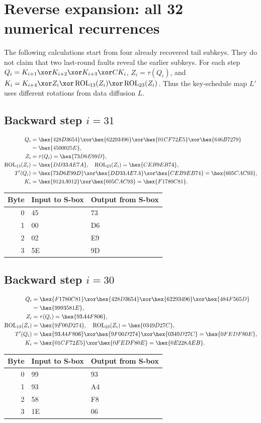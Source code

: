 \section{Reverse expansion: all 32 numerical recurrences}
The following calculations start from four already recovered tail subkeys. They do not claim that two last-round faults reveal the earlier subkeys. For each step $Q_i=K_{i+1}\xor K_{i+2}\xor K_{i+3}\xor CK_i$, $Z_i=\tau(Q_i)$, and $K_i=K_{i+4}\xor Z_i\xor\operatorname{ROL}_{13}(Z_i)\xor\operatorname{ROL}_{23}(Z_i)$. Thus the key-schedule map $L'$ uses different rotations from data diffusion $L$.
\subsection*{Backward step $i=31$}
\begin{align*}
Q_i&=\hex{428D3654}\xor\hex{62293496}\xor\hex{01CF72E5}\xor\hex{646B7279}\\&=\hex{4500025E},\\
Z_i&=\tau(Q_i)=\hex{73D6E99D},\\
\operatorname{ROL}_{13}(Z_i)&=\hex{DD33AE7A},\quad\operatorname{ROL}_{23}(Z_i)=\hex{CEB9EB74},\\
T'(Q_i)&=\hex{73D6E99D}\xor\hex{DD33AE7A}\xor\hex{CEB9EB74}=\hex{605CAC93},\\
K_i&=\hex{9124A012}\xor\hex{605CAC93}=\hex{F1780C81}.\end{align*}
\begingroup\small
\begin{longtable}{rll}
\toprule
Byte & Input to S-box & Output from S-box\\\midrule
\endhead
0 & 45 & 73\\
1 & 00 & D6\\
2 & 02 & E9\\
3 & 5E & 9D\\
\bottomrule\end{longtable}
\endgroup
\subsection*{Backward step $i=30$}
\begin{align*}
Q_i&=\hex{F1780C81}\xor\hex{428D3654}\xor\hex{62293496}\xor\hex{484F565D}\\&=\hex{9993581E},\\
Z_i&=\tau(Q_i)=\hex{93A4F806},\\
\operatorname{ROL}_{13}(Z_i)&=\hex{9F00D274},\quad\operatorname{ROL}_{23}(Z_i)=\hex{0349D27C},\\
T'(Q_i)&=\hex{93A4F806}\xor\hex{9F00D274}\xor\hex{0349D27C}=\hex{0FEDF80E},\\
K_i&=\hex{01CF72E5}\xor\hex{0FEDF80E}=\hex{0E228AEB}.\end{align*}
\begingroup\small
\begin{longtable}{rll}
\toprule
Byte & Input to S-box & Output from S-box\\\midrule
\endhead
0 & 99 & 93\\
1 & 93 & A4\\
2 & 58 & F8\\
3 & 1E & 06\\
\bottomrule\end{longtable}
\endgroup
